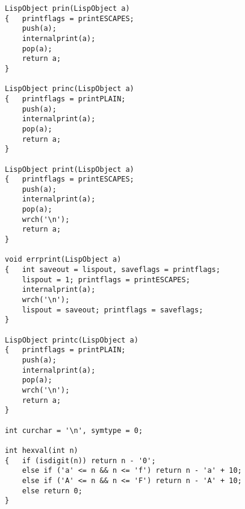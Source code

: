 {\begin{verbatim}
LispObject prin(LispObject a)
{   printflags = printESCAPES;
    push(a);
    internalprint(a);
    pop(a);
    return a;
}

LispObject princ(LispObject a)
{   printflags = printPLAIN;
    push(a);
    internalprint(a);
    pop(a);
    return a;
}

LispObject print(LispObject a)
{   printflags = printESCAPES;
    push(a);
    internalprint(a);
    pop(a);
    wrch('\n');
    return a;
}

void errprint(LispObject a)
{   int saveout = lispout, saveflags = printflags;
    lispout = 1; printflags = printESCAPES;
    internalprint(a);
    wrch('\n');
    lispout = saveout; printflags = saveflags;
}

LispObject printc(LispObject a)
{   printflags = printPLAIN;
    push(a);
    internalprint(a);
    pop(a);
    wrch('\n');
    return a;
}

int curchar = '\n', symtype = 0;

int hexval(int n)
{   if (isdigit(n)) return n - '0';
    else if ('a' <= n && n <= 'f') return n - 'a' + 10;
    else if ('A' <= n && n <= 'F') return n - 'A' + 10;
    else return 0;
}


\end{verbatim}}
